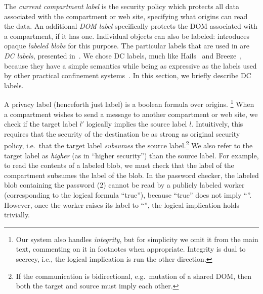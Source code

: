 The \emph{current compartment label} is the security policy which protects all data associated with the compartment or
web site, specifying what origins can read the data.
%
An additional \emph{DOM label} specifically protects the DOM associated
with a compartment, if it has one.
%
Individual objects can also be labeled: \sys{}
introduces opaque \emph{labeled blobs} for this purpose.
%
The particular labels that are used in \sys{} are \emph{DC labels},
presented in~\cite{stefan:2011:dclabels}.
%
We chose DC labels, much like Hails~\cite{giffin:2012:hails} and
Breeze~\cite{Breeze13}, because they have a simple
semantics while being as expressive as the labels used by other practical
confinement systems~\cite{GenLabels}.
%
In this section, we briefly describe DC labels. %

A privacy label (henceforth just label) is a boolean formula over
origins.%
%
\footnote{
  Our system also handles \emph{integrity}, but for simplicity we
  omit it from the main text, commenting on it in footnotes when
  appropriate.  Integrity is dual to secrecy, i.e., the logical
  implication is run the other direction.
}
%
When a compartment wishes to send a message to another compartment or
web site, we check if the target label $l'$ logically implies the source
label $l$.
%
Intuitively, this requires that the security of the destination be as strong as original security policy, i.e.\ that the target label \emph{subsumes} the source label.\footnote{If the communication is bidirectional, e.g.\ mutation of a shared DOM, then both the target and source must imply each other.}
%
We also refer to the target label as \emph{higher} (as in ``higher security'') than the source label.
%
For example, to read the contents of a labeled blob, we must check that
the label of the compartment subsumes the label of the blob.
%
In the password checker, the labeled blob containing the password (2)
cannot be read by a publicly labeled worker (corresponding to the
logical formula ``true''), because ``true'' does not imply
``''.
%
However, once the worker raises its label to ``'', the
logical implication holds trivially.

